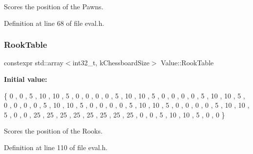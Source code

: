 Scores the position of the Pawns. 



Definition at line 68 of file eval.\+h.

\mbox{\label{namespaceValue_ae8066836a21ce4367ff232f08ce796a8}} 
\subsubsection{\texorpdfstring{Rook\+Table}{RookTable}}
{\footnotesize\ttfamily constexpr std\+::array$<$int32\+\_\+t, k\+Chessboard\+Size$>$ Value\+::\+Rook\+Table}

{\bfseries Initial value\+:}
\begin{DoxyCode}
\{
        0   ,   0   ,   5   ,   10  ,   10  ,   5   ,   0   ,   0   ,
        0   ,   0   ,   5   ,   10  ,   10  ,   5   ,   0   ,   0   ,
        0   ,   0   ,   5   ,   10  ,   10  ,   5   ,   0   ,   0   ,
        0   ,   0   ,   5   ,   10  ,   10  ,   5   ,   0   ,   0   ,
        0   ,   0   ,   5   ,   10  ,   10  ,   5   ,   0   ,   0   ,
        0   ,   0   ,   5   ,   10  ,   10  ,   5   ,   0   ,   0   ,
        25  ,   25  ,   25  ,   25  ,   25  ,   25  ,   25  ,   25  ,
        0   ,   0   ,   5   ,   10  ,   10  ,   5   ,   0   ,   0       
    \}
\end{DoxyCode}


Scores the position of the Rooks. 



Definition at line 110 of file eval.\+h.

